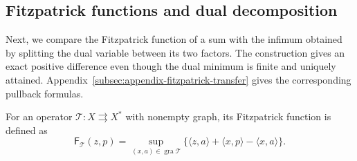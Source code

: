 \documentclass[11pt]{article}
\newcommand{\gra}{\operatorname{gra}}
\newcommand{\pair}[2]{\langle #1,#2\rangle}
\theoremstyle{definition}
\theoremstyle{remark}
\begin{document}
\subsection{Fitzpatrick functions and dual decomposition}
\label{subsec:main-fitzpatrick}
Next, we compare the Fitzpatrick function of a sum with the infimum obtained by splitting the dual variable between its two factors. The construction gives an exact positive difference even though the dual minimum is finite and uniquely attained. Appendix~\ref{subsec:appendix-fitzpatrick-transfer} gives the corresponding pullback formulas.

\label{subsec:fitzpatrick-values}

For an operator $\mathcal T:X\rightrightarrows X^*$ with nonempty graph, its Fitzpatrick function is defined as
\begin{equation}
\mathsf F_{\mathcal T}(z,p)
=\sup_{(x,a)\in\gra\mathcal T}
\{\pair{z}{a}+\pair{x}{p}-\pair{x}{a}\}.
\label{eq:cor-fitzpatrick}
\end{equation}
\end{document}
